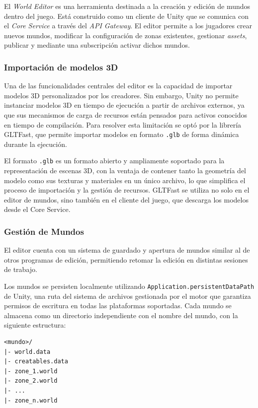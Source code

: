 El \textit{World Editor} es una herramienta destinada a la creación y edición de mundos dentro del juego.
Está construido como un cliente de Unity que se comunica con el \textit{Core Service} a través del \textit{API Gateway}.
El editor permite a los jugadores crear nuevos mundos,
modificar la configuración de zonas existentes, gestionar \textit{assets}, publicar y mediante una subscripción activar dichos mundos.

\subsubsection{Importación de modelos 3D}
Una de las funcionalidades centrales del editor es la capacidad de importar modelos 3D
personalizados por los creadores. Sin embargo, Unity no permite instanciar modelos 3D
en tiempo de ejecución a partir de archivos externos, ya que sus mecanismos de carga de
recursos están pensados para activos conocidos en tiempo de compilación. Para resolver
esta limitación se optó por la librería GLTFast, que permite importar modelos en formato
\texttt{.glb} de forma dinámica durante la ejecución.

\vspace{0.25cm}

El formato \texttt{.glb} es un formato abierto y ampliamente soportado para la
representación de escenas 3D, con la ventaja de contener tanto la geometría del modelo
como sus texturas y materiales en un único archivo, lo que simplifica el proceso de
importación y la gestión de recursos. GLTFast se utiliza no solo en el editor de mundos,
sino también en el cliente del juego, que descarga los modelos desde el Core Service.


\subsubsection{Gestión de Mundos}

El editor cuenta con un sistema de guardado y apertura de mundos similar al de otros programas de edición,
permitiendo retomar la edición en distintas sesiones de trabajo.

Los mundos se persisten localmente utilizando \texttt{Application.persistentDataPath} de Unity, una ruta
del sistema de archivos gestionada por el motor que garantiza permisos de escritura en todas las plataformas
soportadas. Cada mundo se almacena como un directorio independiente con el nombre del mundo, con la
siguiente estructura:

\begin{verbatim}
<mundo>/
|- world.data
|- creatables.data
|- zone_1.world
|- zone_2.world
|- ...
|- zone_n.world
\end{verbatim}

